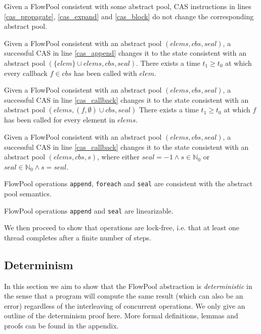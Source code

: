 \documentclass[runningheads,a4paper]{llncs}
\begin{document}
\begin{lemma}
Given a FlowPool consistent with some abstract
pool, CAS instructions in lines \ref{cas_propagate}, \ref{cas_expand} and
\ref{cas_block} do not change the corresponding abstract pool.
\end{lemma}

\begin{lemma}
Given a FlowPool consistent with an abstract pool $(elems, cbs,
seal)$, a successful CAS in line \ref{cas_append}
changes it to the state consistent with an abstract pool
$(\{elem\} \cup elems, cbs, seal)$.
There exists a time $t_1 \geq t_0$ at which every callback $f \in
cbs$ has been called with $elem$.
\end{lemma}

\begin{lemma}
Given a FlowPool consistent with an abstract pool $(elems, cbs, seal)$, 
a successful CAS in line \ref{cas_callback} changes it 
to the state consistent with an abstract pool $(elems, (f, \emptyset)
\cup cbs, seal)$
There exists a time $t_1 \geq t_0$ at which $f$ has been called for
every element in $elems$.
\end{lemma}

\begin{lemma}
Given a FlowPool consistent with an abstract pool $(elems, cbs, seal)$, 
a successful CAS in line \ref{cas_callback} changes it to the state 
consistent with an abstract pool $(elems, cbs, s)$, where either $seal
= -1 \wedge s \in \mathbb{N}_0$ or $seal \in \mathbb{N}_0 \wedge s = seal$.
\end{lemma}

\begin{theorem}[Safety]
FlowPool operations \verb=append=, \verb=foreach=
and \verb=seal= are consistent with the abstract pool semantics.
\end{theorem}

\begin{theorem}
FlowPool operations \verb=append= and \verb=seal= are linearizable.
\end{theorem}

We then proceed to show that operations are lock-free, i.e. that at
least one thread completes after a finite number of steps.


\subsection{Determinism}

In this section we aim to show that the FlowPool abstraction is
\emph{deterministic} in the sense that a program will compute the same
result (which can also be an error) regardless of the interleaving of
concurrent operations. We only give an outline of the determinism
proof here. More formal definitions, lemmas and proofs can be found in
the appendix.
\end{document}
